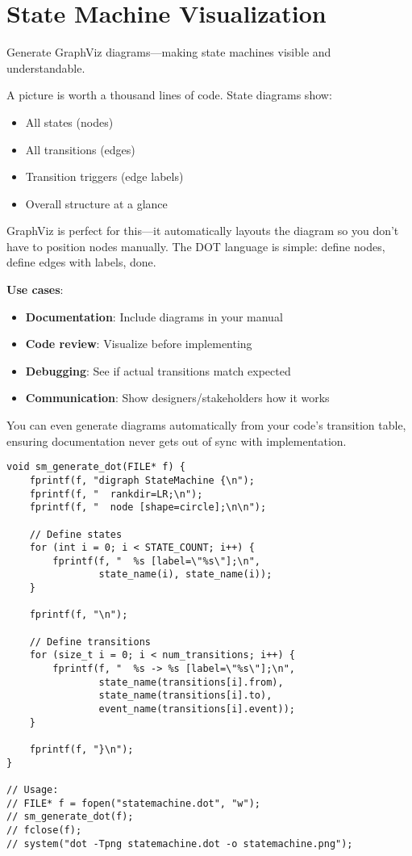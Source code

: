 \section{State Machine Visualization}

Generate GraphViz diagrams—making state machines visible and understandable.

A picture is worth a thousand lines of code. State diagrams show:
\begin{itemize}
    \item All states (nodes)
    \item All transitions (edges)
    \item Transition triggers (edge labels)
    \item Overall structure at a glance
\end{itemize}

GraphViz is perfect for this—it automatically layouts the diagram so you don't have to position nodes manually. The DOT language is simple: define nodes, define edges with labels, done.

\textbf{Use cases}:
\begin{itemize}
    \item \textbf{Documentation}: Include diagrams in your manual
    \item \textbf{Code review}: Visualize before implementing
    \item \textbf{Debugging}: See if actual transitions match expected
    \item \textbf{Communication}: Show designers/stakeholders how it works
\end{itemize}

You can even generate diagrams automatically from your code's transition table, ensuring documentation never gets out of sync with implementation.

\begin{lstlisting}
void sm_generate_dot(FILE* f) {
    fprintf(f, "digraph StateMachine {\n");
    fprintf(f, "  rankdir=LR;\n");
    fprintf(f, "  node [shape=circle];\n\n");

    // Define states
    for (int i = 0; i < STATE_COUNT; i++) {
        fprintf(f, "  %s [label=\"%s\"];\n",
                state_name(i), state_name(i));
    }

    fprintf(f, "\n");

    // Define transitions
    for (size_t i = 0; i < num_transitions; i++) {
        fprintf(f, "  %s -> %s [label=\"%s\"];\n",
                state_name(transitions[i].from),
                state_name(transitions[i].to),
                event_name(transitions[i].event));
    }

    fprintf(f, "}\n");
}

// Usage:
// FILE* f = fopen("statemachine.dot", "w");
// sm_generate_dot(f);
// fclose(f);
// system("dot -Tpng statemachine.dot -o statemachine.png");
\end{lstlisting}


